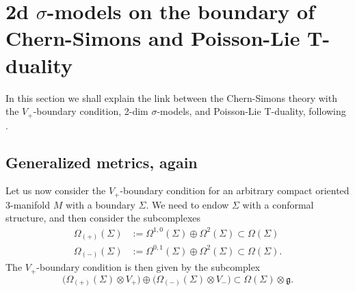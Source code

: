 \documentclass[a4paper]{amsart}
\theoremstyle{plain}
\theoremstyle{definition}
\newcommand{\g}{\mathfrak{g}}
\newcommand{\la}{\langle}
\newcommand{\ra}{\rangle}
\begin{document}
\section{2d $\sigma$-models on the boundary of Chern-Simons and Poisson-Lie T-duality}\label{sec:PL}

In this section we shall explain the link between the Chern-Simons theory with the $V_+$-boundary condition, 2-dim $\sigma$-models, and Poisson-Lie T-duality, following \cite{S, PSV}.
\subsection{Generalized metrics, again}
Let us now consider the $V_+$-boundary condition for an arbitrary compact oriented 3-manifold $M$ with a boundary $\Sigma$. We need to endow $\Sigma$ with a conformal structure, and then consider the subcomplexes
\begin{align*}
\Omega_{(+)}(\Sigma)&:=\Omega^{1,0}(\Sigma)\oplus\Omega^2(\Sigma)\subset\Omega(\Sigma)\\
\Omega_{(-)}(\Sigma)&:=\Omega^{0,1}(\Sigma)\oplus\Omega^2(\Sigma)\subset\Omega(\Sigma).
\end{align*}
The $V_+$-boundary condition is then given by the subcomplex
$$\bigl(\Omega_{(+)}(\Sigma)\otimes V_+\bigr) \oplus \bigl(\Omega_{(-)}(\Sigma)\otimes V_-\bigr) \subset\Omega(\Sigma)\otimes\g.$$


\end{document}
